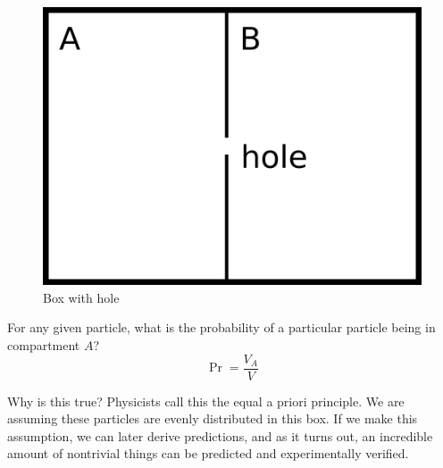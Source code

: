 \documentclass[a4paper,twoside,master.tex]{subfiles}
\begin{document}
\begin{figure}[h]
    \centering
    \includegraphics[width=\textwidth/2]{figures/lec_03_box_with_hole.png}
    \caption{Box with hole}
    \label{fig:box_with_hole}
\end{figure}

For any given particle, what is the probability of a particular particle being in compartment $ A $?
\begin{equation}
    \Pr = \frac{V_A}{V}
\end{equation}

Why is this true? Physicists call this the equal a priori principle. We are assuming these particles are evenly distributed in this box. If we make this assumption, we can later derive predictions, and as it turns out, an incredible amount of nontrivial things can be predicted and experimentally verified.
\end{document}
